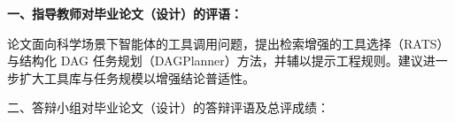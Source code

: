 \cleardoublepage{}

{
    \bfseries
    \noindent 一、指导教师对毕业论文（设计）的评语：

    \mdseries\normalsize\vspace{0.5ex}
    \noindent 论文面向科学场景下智能体的工具调用问题，提出检索增强的工具选择（RATS）与结构化 DAG 任务规划（DAGPlanner）方法，并辅以提示工程规则。建议进一步扩大工具库与任务规模以增强结论普适性。
    \vspace{1ex}

    \bfseries
    \signature{指导教师（签名）}
    \vspace{-1ex}

    \noindent 二、答辩小组对毕业论文（设计）的答辩评语及总评成绩：\\
    \vspace{-1ex}

    \mbox{} \vfill

    \finaleval[8][13][5][][]
    \vspace{-0.5ex}

    \signature{负责人（签名）}
}
